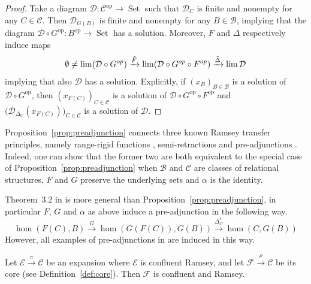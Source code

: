 \documentclass[preprint,12pt]{elsarticle}
\newcommand{\cat}[1]{\mathcal{#1}}
\newcommand{\op}{^{\mathop{op}}}
\DeclareMathOperator{\Set}{Set}
\begin{document}
\begin{proof}
    Take a diagram $\cat D:\cat C\op\to\Set$ such that $\cat D_C$ is finite and nonempty for any $C\in\cat C$.  Then $\cat D_{G(B)}$ is finite and nonempty for any $B\in\cat B$, implying that the diagram $\cat D\circ G\op:B\op\to\Set $ has a solution. Moreover, $F$ and $\Delta$ respectively induce maps
    $$
    \emptyset\neq\lim(\cat D\circ G\op)
    \xrightarrow{\tilde{F}}\lim(\cat D\circ G\op\circ F\op) 
    \xrightarrow{\Tilde{\Delta}} \lim\cat D
    $$
    implying that also $\cat D$ has a solution. Explicitly, if $(x_B)_{B\in\cat B}$ is a solution of $\cat D\circ G\op$, then $(x_{F (C)})_{C\in\cat C}$ is a solution of $\cat D\circ G\op\circ F\op$ and $\big(\cat D_{\Delta_C}(x_{F(C)})\big)_{C\in\cat C}$ is a solution of $\cat D$.
\end{proof}
\begin{rem}
Proposition~\ref{prop:preadjunction} connects three known Ramsey transfer principles, namely range-rigid functions \cite[Lemma~10]{mottet2021cores}, semi-retractions  \cite[Theorem~3.5]{scow2021semiretractions} and pre-adjunctions \cite[Theorem 3.2]{mavsulovic2018pre}. 
Indeed, one can show that the former two are both equivalent to the special case of Proposition~\ref{prop:preadjunction} when $\cat B$ and $\cat C$ are classes of relational structures, $F$ and $G$ preserve the underlying sets and $\alpha$ is the identity.

Theorem~3.2 in \cite{mavsulovic2018pre} is more general than Proposition~\ref{prop:preadjunction}, in particular $F$, $G$ and $\alpha$ as above induce a pre-adjunction in the following way.
$$
\hom(F(C), B) \xrightarrow{G}
\hom(G(F(C)),G(B))\xrightarrow{\Delta_C^*} 
\hom(C,G(B))
$$
However, all examples of pre-adjunctions in \cite{mavsulovic2018pre} are induced in this way.
\end{rem}

\begin{cor}
    Let $\cat E\xrightarrow{\pi}\cat C$ be an expansion where $\cat E$ is confluent Ramsey, and let $\cat F\xrightarrow{\rho}\cat C$ be its core (see Definition~\ref{def:core}). Then $\cat F$ is confluent and Ramsey.
\end{cor}
\end{document}
